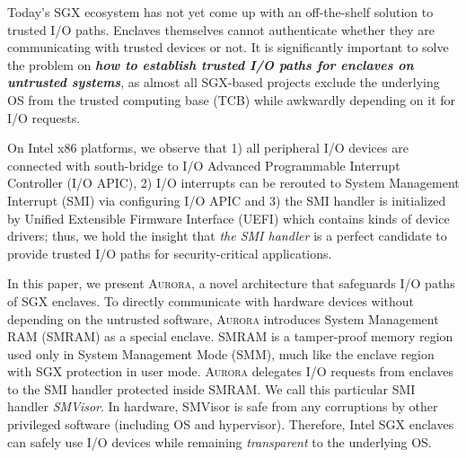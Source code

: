 Today's SGX ecosystem has not yet come up with an off-the-shelf solution to trusted I/O paths. Enclaves themselves cannot authenticate whether they are communicating with trusted devices or not. It is significantly important to solve the problem on \textbf{\emph{how to establish trusted I/O paths for enclaves on untrusted systems}}, as almost all SGX-based projects exclude the underlying OS from the trusted computing base (TCB) while awkwardly depending on it for I/O requests.

On Intel x86 platforms, we observe that 1) all peripheral I/O devices are connected with south-bridge to I/O Advanced Programmable Interrupt Controller (I/O APIC), 2) I/O interrupts can be rerouted to System Management Interrupt (SMI) via configuring I/O APIC and 3) the SMI handler is initialized by Unified Extensible Firmware Interface (UEFI) which contains kinds of device drivers; thus, we hold the insight that \textit{the SMI handler} is a perfect candidate to provide trusted I/O paths for security-critical applications.

In this paper, we present \textsc{Aurora}, a novel architecture that safeguards I/O paths of SGX enclaves. To directly communicate with hardware devices without depending on the untrusted software, \textsc{Aurora} introduces System Management RAM (SMRAM) as a special enclave. SMRAM is a tamper-proof memory region used only in System Management Mode (SMM), much like the enclave region with SGX protection in user mode. \textsc{Aurora} delegates I/O requests from enclaves to the SMI handler protected inside SMRAM. We call this particular SMI handler \textit{SMVisor}. In hardware, SMVisor is safe from any corruptions by other privileged software (including OS and hypervisor). Therefore, Intel SGX enclaves can safely use I/O devices while remaining \textit{transparent} to the underlying OS.


